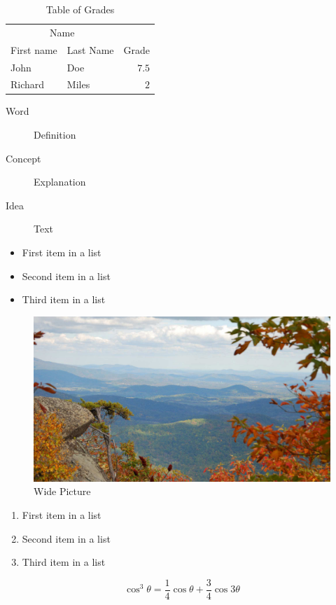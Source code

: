 \lipsum[11]

\begin{table}[hbt]
\caption{Table of Grades}
\centering
\begin{tabular}{llr}
\toprule
\multicolumn{2}{c}{Name} \\
\cmidrule(r){1-2}
First name & Last Name & Grade \\
\midrule
John & Doe & $7.5$ \\
Richard & Miles & $2$ \\
\bottomrule
\end{tabular}
\label{tab:label}
\end{table}

\begin{description}
\item[Word] Definition
\item[Concept] Explanation
\item[Idea] Text
\end{description}

\begin{itemize}[noitemsep] 
\item First item in a list
\item Second item in a list
\item Third item in a list
\end{itemize}

\begin{figure}[ht]\centering 
\includegraphics[width=\linewidth]{figures/view.jpg}
\caption{Wide Picture}
\label{fig:view}
\end{figure}

\begin{enumerate}[noitemsep] %
\item First item in a list
\item Second item in a list
\item Third item in a list
\end{enumerate}

\begin{equation}
\cos^3 \theta =\frac{1}{4}\cos\theta+\frac{3}{4}\cos 3\theta
\label{eq:refname2}
\end{equation}